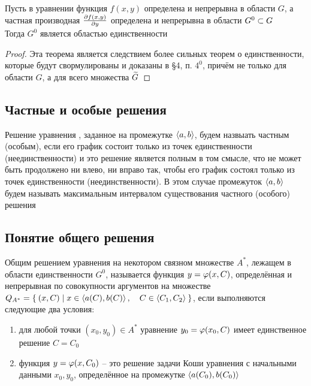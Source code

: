 \begin{theorem}\label{th:uniq:weak}
    Пусть в уравнении  функция $ f(x, y) $ определена и непрерывна в области $ G $, а частная производная $ \frac{\partial {f(x, y)}}{\partial {y}} $ определена и непрерывна в области $ G^0 \subset G $ \\
    Тогда $ G^0 $ является областью единственности
\end{theorem}

\begin{proof}
    Эта теорема является следствием более сильных теорем о единственности, которые будут свормулированы и доказаны в \S4, п. $ 4^0 $, причём не только для области $ G $, а для всего множества $ \widetilde{G} $
\end{proof}

\subsection{Частные и особые решения}

\begin{definition}
    Решение уравнения , заданное на промежутке $ \Braket{a, b} $, будем назвыать частным (особым), если его график состоит только из точек единственности (неединственности) и это решение является полным в том смысле, что не может быть продолжено ни влево, ни вправо так, чтобы его график состоял только из точек единственности (неединственности). В этом случае промежуток $ \Braket{a, b} $ будем называть максимальным интервалом существования частного (особого) решения
\end{definition}

\subsection{Понятие общего решения}

\begin{definition}\label{def:common}
    Общим решением уравнения  на некотором связном множестве $ A^* $, лежащем в области единственности $ G^0 $, называется функция $ y = \varphi(x, C) $, определённая и непрерывная по совокупности аргументов на множестве $ Q_{A^*} = \Set{(x, C) | x \in \Braket{a(C), b(C)}, \quad C \in \Braket{C_1, C_2}} $, если выполняются следующие два условия:
    \begin{enumerate}
    	\item для любой точки $ (x_0, y_0) \in A^* $ уравнение $ y_0 = \varphi(x_0, C) $ имеет единственное решение $ C = C_0 $
        \item функция $ y = \varphi(x, C_0) $ -- это решение задачи Коши уравнения  с начальными данными $ x_0, y_0 $, определённое на промежутке $ \Braket{a(C_0), b(C_0)} $
    \end{enumerate}
\end{definition}

